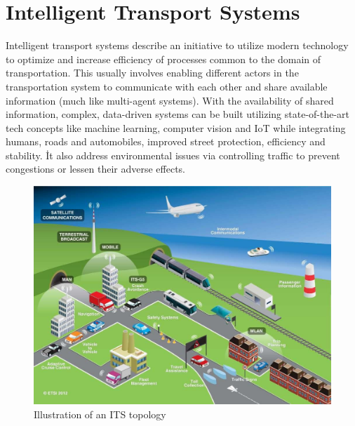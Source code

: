 \documentclass[main.tex]{subfiles}
\begin{document}
\section{Intelligent Transport Systems}\label{its}

Intelligent transport systems describe an initiative to utilize modern technology 
to optimize and increase efficiency of processes common to the domain of transportation. 
This usually involves enabling different actors in the transportation system to communicate 
with each other and share available information (much like multi-agent systems). With the 
availability of shared information, complex, data-driven systems can be built utilizing 
state-of-the-art tech concepts like machine learning, computer vision and IoT while
integrating humans, roads and automobiles, improved street protection, efficiency and stability.
İt also address environmental issues via controlling traffic to prevent congestions or lessen
their adverse effects.

\begin{figure}[htbp]
    \centering
    \includegraphics[width=.8\textwidth]{ITS-schema.jpg}
    \caption{Illustration of an ITS topology \cite{ETSI}}
    \label{its-map}
\end{figure}
\end{document}
